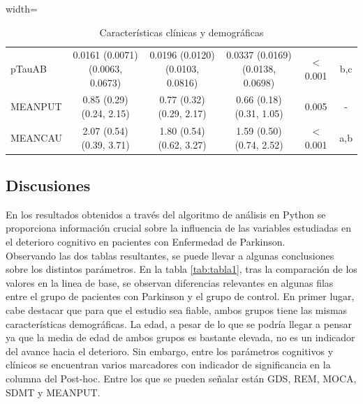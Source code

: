 \documentclass[12pt]{article}
\begin{document}
\begin{description}
\begin{table}[t]
\begin{adjustbox}{width=\textwidth}
\begin{tabular}{|l||c|c|c|c|c|}
				pTauAB &   0.0161 (0.0071) (0.0063, 0.0673) &   0.0196 (0.0120) (0.0103, 0.0816) &   0.0337 (0.0169) (0.0138, 0.0698) & $<$ 0.001 &      b,c \\
				MEANPUT &           0.85 (0.29) (0.24, 2.15) &           0.77 (0.32) (0.29, 2.17) &           0.66 (0.18) (0.31, 1.05) &     0.005 &    -      \\
				MEANCAU &           2.07 (0.54) (0.39, 3.71) &           1.80 (0.54) (0.62, 3.27) &           1.59 (0.50) (0.74, 2.52) & $<$ 0.001 &      a,b \\ 
				\bottomrule
			\end{tabular}
		\end{adjustbox}
		\caption{Características clínicas y demográficas}
		\label{tab:tabla2}
	\end{table}
	
\end{description}

\subsection{Discusiones}
En los resultados obtenidos a través del algoritmo de análisis en Python se proporciona información crucial sobre la influencia de las variables estudiadas en el deterioro cognitivo en pacientes con Enfermedad de Parkinson.\\

Observando las dos tablas resultantes, se puede llevar a algunas conclusiones sobre los distintos parámetros. En la tabla \ref{tab:tabla1}, tras la comparación de los valores en la linea de base, se observan diferencias relevantes en algunas filas entre el grupo de pacientes con Parkinson y el grupo de control. En primer lugar, cabe destacar que para que el estudio sea fiable, ambos grupos tiene las mismas características demográficas. La edad, a pesar de lo que se podría llegar a pensar ya que la media de edad de ambos grupos es bastante elevada, no es un indicador del avance hacia el deterioro. Sin embargo, entre los parámetros cognitivos y clínicos se encuentran varios marcadores con indicador de significancia en la columna del Post-hoc. Entre los que se pueden señalar están GDS, REM, MOCA, SDMT y MEANPUT. \\
\end{document}
